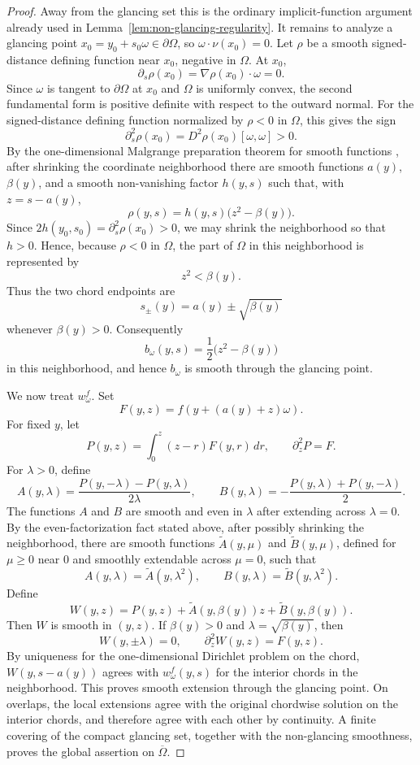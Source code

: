 \documentclass[11pt]{article}
\numberwithin{equation}{section}
\begin{document}
\begin{proof}
Away from the glancing set this is the ordinary implicit-function argument already used in Lemma~\ref{lem:non-glancing-regularity}.  It remains to analyze a glancing point \(x_0=y_0+s_0\omega\in\partial\Omega\), so \(\omega\cdot\nu(x_0)=0\).  Let \(\rho\) be a smooth signed-distance defining function near \(x_0\), negative in \(\Omega\).  At \(x_0\),
\[
    \partial_s\rho(x_0)=\nabla\rho(x_0)\cdot\omega=0.
\]
Since \(\omega\) is tangent to \(\partial\Omega\) at \(x_0\) and \(\Omega\) is uniformly convex, the second fundamental form is positive definite with respect to the outward normal.  For the signed-distance defining function normalized by \(\rho<0\) in \(\Omega\), this gives the sign
\[
    \partial_s^2\rho(x_0)=D^2\rho(x_0)[\omega,\omega]>0 .
\]
By the one-dimensional Malgrange preparation theorem for smooth functions \cite{Malgrange1966}, after shrinking the coordinate neighborhood there are smooth functions \(a(y)\), \(\beta(y)\), and a smooth non-vanishing factor \(h(y,s)\) such that, with \(z=s-a(y)\),
\[
    \rho(y,s)=h(y,s)\bigl(z^2-\beta(y)\bigr).
\]
Since \(2h(y_0,s_0)=\partial_s^2\rho(x_0)>0\), we may shrink the neighborhood so that \(h>0\).  Hence, because \(\rho<0\) in \(\Omega\), the part of \(\Omega\) in this neighborhood is represented by
\[
    z^2<\beta(y).
\]
Thus the two chord endpoints are
\[
    s_\pm(y)=a(y)\pm\sqrt{\beta(y)}
\]
whenever \(\beta(y)>0\).  Consequently
\[
    b_\omega(y,s)
    =\frac12\bigl(z^2-\beta(y)\bigr)
\]
in this neighborhood, and hence \(b_\omega\) is smooth through the glancing point.

We now treat \(w_\omega^f\).  Set
\[
    F(y,z)=f(y+(a(y)+z)\omega).
\]
For fixed \(y\), let
\[
    P(y,z)=\int_0^z (z-r)F(y,r)\,dr,
    \qquad
    \partial_z^2P=F.
\]
For \(\lambda>0\), define
\[
    A(y,\lambda)=\frac{P(y,-\lambda)-P(y,\lambda)}{2\lambda},
    \qquad
    B(y,\lambda)=-\frac{P(y,\lambda)+P(y,-\lambda)}2 .
\]
The functions \(A\) and \(B\) are smooth and even in \(\lambda\) after extending across \(\lambda=0\).  By the even-factorization fact stated above, after possibly shrinking the neighborhood, there are smooth functions \(\widetilde A(y,\mu)\) and \(\widetilde B(y,\mu)\), defined for \(\mu\ge0\) near \(0\) and smoothly extendable across \(\mu=0\), such that
\[
    A(y,\lambda)=\widetilde A(y,\lambda^2),
    \qquad
    B(y,\lambda)=\widetilde B(y,\lambda^2).
\]
Define
\[
    W(y,z)=P(y,z)+\widetilde A(y,\beta(y))z+\widetilde B(y,\beta(y)).
\]
Then \(W\) is smooth in \((y,z)\).  If \(\beta(y)>0\) and \(\lambda=\sqrt{\beta(y)}\), then
\[
    W(y,\pm\lambda)=0,
    \qquad
    \partial_z^2W(y,z)=F(y,z).
\]
By uniqueness for the one-dimensional Dirichlet problem on the chord, \(W(y,s-a(y))\) agrees with \(w_\omega^f(y,s)\) for the interior chords in the neighborhood.  This proves smooth extension through the glancing point.  On overlaps, the local extensions agree with the original chordwise solution on the interior chords, and therefore agree with each other by continuity.  A finite covering of the compact glancing set, together with the non-glancing smoothness, proves the global assertion on \(\overline\Omega\).
\end{proof}
\end{document}
